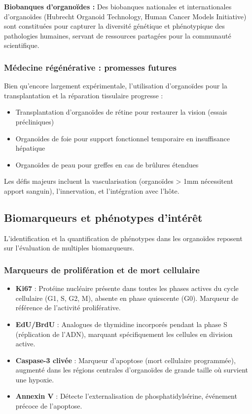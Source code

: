 \textbf{Biobanques d'organoïdes :}
Des biobanques nationales et internationales d'organoïdes (Hubrecht Organoid Technology, Human Cancer Models Initiative) sont constituées pour capturer la diversité génétique et phénotypique des pathologies humaines, servant de ressources partagées pour la communauté scientifique.

\subsubsection{Médecine régénérative : promesses futures}

Bien qu'encore largement expérimentale, l'utilisation d'organoïdes pour la transplantation et la réparation tissulaire progresse :
\begin{itemize}
    \item Transplantation d'organoïdes de rétine pour restaurer la vision (essais précliniques)
    \item Organoïdes de foie pour support fonctionnel temporaire en insuffisance hépatique
    \item Organoïdes de peau pour greffes en cas de brûlures étendues
\end{itemize}

Les défis majeurs incluent la vascularisation (organoïdes > 1mm nécessitent apport sanguin), l'innervation, et l'intégration avec l'hôte.

\subsection{Biomarqueurs et phénotypes d'intérêt}

L'identification et la quantification de phénotypes dans les organoïdes reposent sur l'évaluation de multiples biomarqueurs.

\subsubsection{Marqueurs de prolifération et de mort cellulaire}

\begin{itemize}
    \item \textbf{Ki67} : Protéine nucléaire présente dans toutes les phases actives du cycle cellulaire (G1, S, G2, M), absente en phase quiescente (G0). Marqueur de référence de l'activité proliférative.
    \item \textbf{EdU/BrdU} : Analogues de thymidine incorporés pendant la phase S (réplication de l'ADN), marquant spécifiquement les cellules en division active.
    \item \textbf{Caspase-3 clivée} : Marqueur d'apoptose (mort cellulaire programmée), augmenté dans les régions centrales d'organoïdes de grande taille où survient une hypoxie.
    \item \textbf{Annexin V} : Détecte l'externalisation de phosphatidylsérine, événement précoce de l'apoptose.
\end{itemize}

